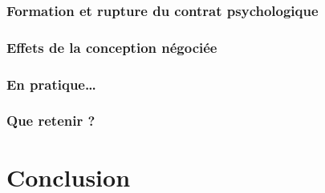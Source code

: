 \documentclass[12pt]{article}
\begin{document}
		\subsubsection{Formation et rupture du contrat psychologique}
		\subsubsection{Effets de la conception négociée}
		\subsubsection{En pratique…}
		\subsubsection{Que retenir ?}

\section{Conclusion}



\end{document}

